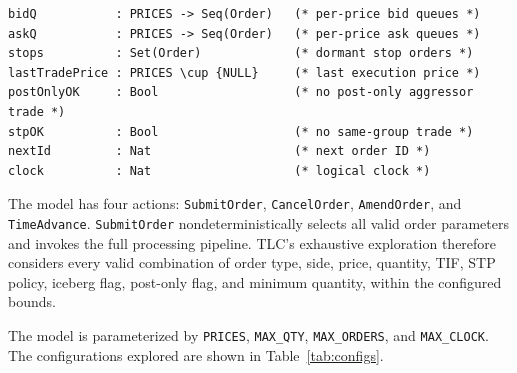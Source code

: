 \documentclass[11pt,a4paper]{article}
\begin{document}
\begin{lstlisting}[language=tlaplus]
bidQ           : PRICES -> Seq(Order)   (* per-price bid queues *)
askQ           : PRICES -> Seq(Order)   (* per-price ask queues *)
stops          : Set(Order)             (* dormant stop orders *)
lastTradePrice : PRICES \cup {NULL}     (* last execution price *)
postOnlyOK     : Bool                   (* no post-only aggressor trade *)
stpOK          : Bool                   (* no same-group trade *)
nextId         : Nat                    (* next order ID *)
clock          : Nat                    (* logical clock *)
\end{lstlisting}

The model has four actions: \texttt{SubmitOrder}, \texttt{CancelOrder},
\texttt{AmendOrder}, and \texttt{TimeAdvance}. \texttt{SubmitOrder}
nondeterministically selects all valid order parameters and invokes the
full processing pipeline. TLC's exhaustive exploration therefore
considers every valid combination of order type, side, price, quantity,
TIF, STP policy, iceberg flag, post-only flag, and minimum quantity,
within the configured bounds.

The model is parameterized by \texttt{PRICES}, \texttt{MAX\_QTY},
\texttt{MAX\_ORDERS}, and \texttt{MAX\_CLOCK}. The configurations
explored are shown in Table~\ref{tab:configs}.
\end{document}
